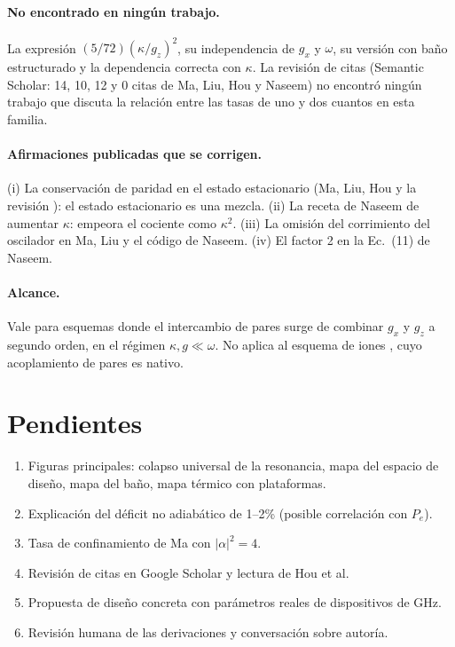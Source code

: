 \documentclass[11pt]{report}
\begin{document}
\paragraph{No encontrado en ning\'un trabajo.} La expresi\'on $(5/72)(\kappa/g_{z})^{2}$, su independencia de $g_{x}$ y $\omega$, su versi\'on con baño estructurado y la dependencia correcta con $\kappa$. La revisi\'on de citas (Semantic Scholar: 14, 10, 12 y 0 citas de Ma, Liu, Hou y Naseem) no encontr\'o ning\'un trabajo que discuta la relaci\'on entre las tasas de uno y dos cuantos en esta familia.

\paragraph{Afirmaciones publicadas que se corrigen.} (i) La conservaci\'on de paridad en el estado estacionario (Ma, Liu, Hou y la revisi\'on \cite{Lu2026}): el estado estacionario es una mezcla. (ii) La receta de Naseem de aumentar $\kappa$: empeora el cociente como $\kappa^{2}$. (iii) La omisi\'on del corrimiento del oscilador en Ma, Liu y el c\'odigo de Naseem. (iv) El factor 2 en la Ec.~(11) de Naseem.

\paragraph{Alcance.} Vale para esquemas donde el intercambio de pares surge de combinar $g_{x}$ y $g_{z}$ a segundo orden, en el r\'egimen $\kappa,g\ll\omega$. No aplica al esquema de iones \cite{deMatos1996}, cuyo acoplamiento de pares es nativo.

\section{Pendientes}

\begin{enumerate}
\item Figuras principales: colapso universal de la resonancia, mapa del espacio de dise\~no, mapa del baño, mapa t\'ermico con plataformas.
\item Explicaci\'on del d\'eficit no adiab\'atico de 1--2\% (posible correlaci\'on con $P_{e}$).
\item Tasa de confinamiento de Ma con $|\alpha|^{2}=4$.
\item Revisi\'on de citas en Google Scholar y lectura de Hou et al.
\item Propuesta de dise\~no concreta con par\'ametros reales de dispositivos de GHz.
\item Revisi\'on humana de las derivaciones y conversaci\'on sobre autor\'ia.
\end{enumerate}



\end{document}
